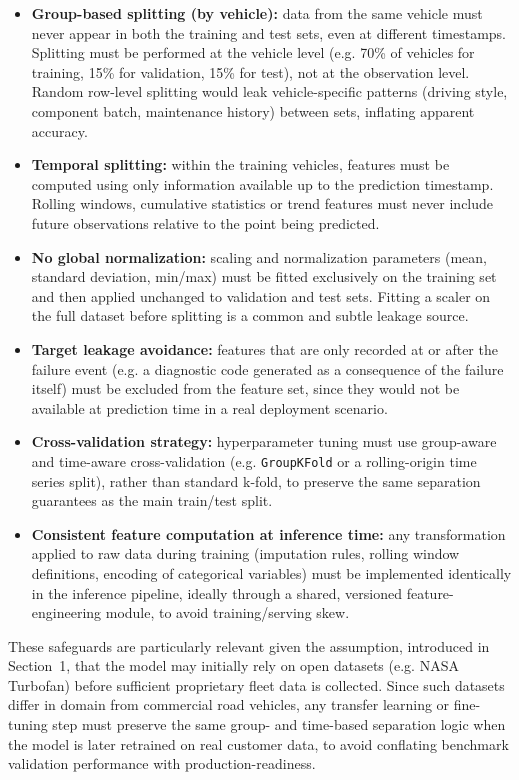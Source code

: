 \documentclass[11pt,a4paper]{article}
\begin{document}
\begin{itemize}
    \item \textbf{Group-based splitting (by vehicle):} data from the same vehicle must never appear in both the training and test sets, even at different timestamps. Splitting must be performed at the vehicle level (e.g. 70\% of vehicles for training, 15\% for validation, 15\% for test), not at the observation level. Random row-level splitting would leak vehicle-specific patterns (driving style, component batch, maintenance history) between sets, inflating apparent accuracy.
    \item \textbf{Temporal splitting:} within the training vehicles, features must be computed using only information available up to the prediction timestamp. Rolling windows, cumulative statistics or trend features must never include future observations relative to the point being predicted.
    \item \textbf{No global normalization:} scaling and normalization parameters (mean, standard deviation, min/max) must be fitted exclusively on the training set and then applied unchanged to validation and test sets. Fitting a scaler on the full dataset before splitting is a common and subtle leakage source.
    \item \textbf{Target leakage avoidance:} features that are only recorded at or after the failure event (e.g. a diagnostic code generated as a consequence of the failure itself) must be excluded from the feature set, since they would not be available at prediction time in a real deployment scenario.
    \item \textbf{Cross-validation strategy:} hyperparameter tuning must use group-aware and time-aware cross-validation (e.g. \texttt{GroupKFold} or a rolling-origin time series split), rather than standard k-fold, to preserve the same separation guarantees as the main train/test split.
    \item \textbf{Consistent feature computation at inference time:} any transformation applied to raw data during training (imputation rules, rolling window definitions, encoding of categorical variables) must be implemented identically in the inference pipeline, ideally through a shared, versioned feature-engineering module, to avoid training/serving skew.
\end{itemize}

\noindent These safeguards are particularly relevant given the assumption, introduced in Section~1, that the model may initially rely on open datasets (e.g. NASA Turbofan) before sufficient proprietary fleet data is collected. Since such datasets differ in domain from commercial road vehicles, any transfer learning or fine-tuning step must preserve the same group- and time-based separation logic when the model is later retrained on real customer data, to avoid conflating benchmark validation performance with production-readiness.
\end{document}
